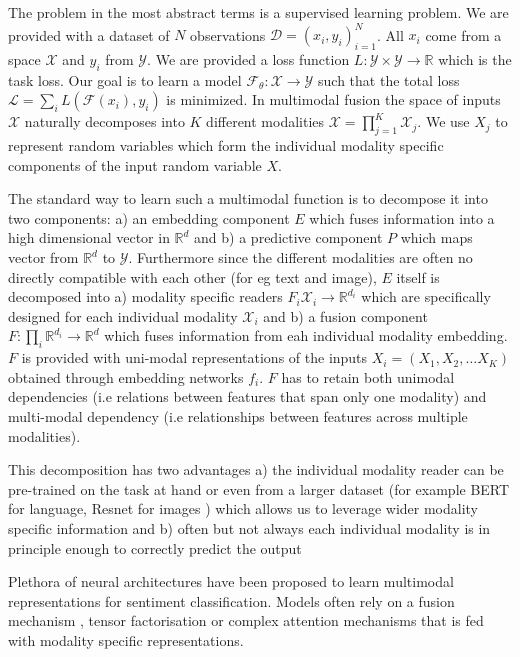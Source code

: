 \documentclass[letterpaper]{article} %
\begin{document}
The problem in the most abstract terms is a supervised learning problem. We are provided with a dataset of $N$ observations $\mathcal{D} = { (x_i,y_i)_{i=1}^{N}} $. All $x_i$ come from a space $\mathcal{X}$ and $y_i$ from $\mathcal{Y}$. We are provided a loss function $L : \mathcal{Y} \times \mathcal{Y} \rightarrow \mathbb{R}$ which is the task loss. Our goal is to learn a model $\mathcal{F}_{\theta}: \mathcal{X} \rightarrow \mathcal{Y}$ such that the total loss  $\mathcal{L} =  \sum_i L(\mathcal{F}(x_i),y_i)$ is minimized.
In multimodal fusion the space of inputs $\mathcal{X}$ naturally decomposes into $K$ different modalities $\mathcal{X} = \prod_{j=1}^K \mathcal{X}_j$.  We use $X_j$ to represent random variables which form the individual modality specific components of the input random variable $X$.

The standard way to learn such a multimodal function is to decompose it into two components: a) an embedding component $E$ which fuses information into a high dimensional vector in $\mathbb{R}^d$ and b) a predictive component $P$ which maps vector from  $\mathbb{R}^d$ to $\mathcal{Y}$. Furthermore since the different modalities are often no directly compatible with each other (for eg text and image), $E$ itself is decomposed into a) modality specific readers $F_i \mathcal{X}_i \rightarrow \mathbb{R}^{d_i}$ which are specifically designed for each individual modality $\mathcal{X}_i$ and b) a fusion component $F : \prod_i \mathbb{R}^{d_i} \rightarrow \mathbb{R}^d$ which fuses information from eah individual modality embedding. $F$ is provided with uni-modal representations of the inputs $X_i = (X_1,X_2, \dots X_K)$ obtained through embedding networks $f_i$. $F$ has to retain both unimodal dependencies (i.e relations between features that span only one modality) and multi-modal dependency (i.e relationships between features across multiple modalities).

This decomposition has two advantages a) the individual modality reader can be pre-trained on the task at hand or even from a larger dataset (for example  BERT \citep{devlin2018bert} for language, Resnet \citep{he2016identity} for images ) which allows us to leverage wider modality specific information and b) often but not always each individual modality is in principle enough to correctly predict the output


Plethora of neural architectures have been proposed to learn multimodal representations for sentiment classification. Models often rely on a fusion mechanism \citep{khan2012color}, tensor factorisation \citep{liu2018efficient, zadeh2019factorized} or complex attention mechanisms \citep{zadeh2018memory} that is fed with modality specific representations. 
\end{document}
